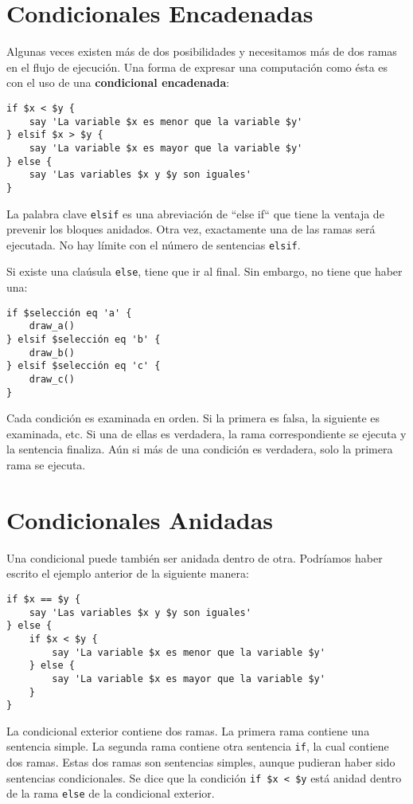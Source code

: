 \section{Condicionales Encadenadas}

Algunas veces existen más de dos posibilidades y 
necesitamos más de dos ramas en el flujo de ejecución.
Una forma de expresar una computación como ésta es con
el uso de una {\bf condicional encadenada}:

\begin{verbatim}
if $x < $y {
    say 'La variable $x es menor que la variable $y'
} elsif $x > $y {
    say 'La variable $x es mayor que la variable $y' 
} else {
    say 'Las variables $x y $y son iguales'
}
\end{verbatim}
%
La palabra clave {\tt elsif} es una abreviación de ``else if``
que tiene la ventaja de prevenir los bloques anidados. Otra vez,
exactamente una de las ramas será ejecutada. No hay límite 
con el número de sentencias {\tt elsif}.

Si existe una claúsula {\tt else}, tiene que ir al 
final. Sin embargo, no tiene que haber una:


\begin{verbatim}
if $selección eq 'a' {
    draw_a()
} elsif $selección eq 'b' {
    draw_b()
} elsif $selección eq 'c' {
    draw_c()
}
\end{verbatim}
%
Cada condición es examinada en orden. Si la primera
es falsa, la siguiente es examinada, etc. Si una de ellas
es verdadera, la rama correspondiente se ejecuta y la
sentencia finaliza. Aún si más de una condición es verdadera,
solo la primera rama se ejecuta.


\section{Condicionales Anidadas}

Una condicional puede también ser anidada dentro de otra. Podríamos
haber escrito el ejemplo anterior de la siguiente manera:

\begin{verbatim}
if $x == $y {
    say 'Las variables $x y $y son iguales'
} else {
    if $x < $y {
        say 'La variable $x es menor que la variable $y'
    } else {
        say 'La variable $x es mayor que la variable $y'
    }
}
\end{verbatim}
%
La condicional exterior contiene dos ramas. La primera
rama contiene una sentencia simple. La segunda rama contiene
otra sentencia {\tt if}, la cual contiene dos ramas. Estas 
dos ramas son sentencias simples, aunque pudieran haber sido
sentencias condicionales. Se dice que la condición \verb|if $x < $y| 
está anidad dentro de la rama {\tt else} de la condicional
exterior.

